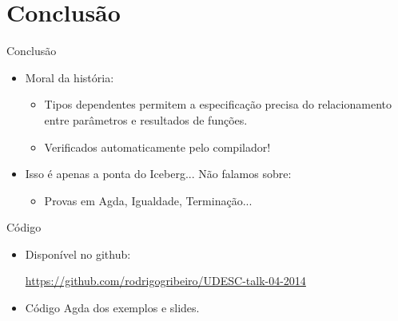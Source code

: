 \documentclass{beamer}
\begin{document}
       \section{Conclus\~ao}
       \begin{frame}{Conclus\~ao}
         \begin{itemize}
           \item Moral da hist\'oria:
           \begin{itemize}
             \item Tipos dependentes permitem a especifica\c{c}\~ao precisa do relacionamento entre par\^ametros e
                   resultados de fun\c{c}\~oes.
             \item Verificados automaticamente pelo compilador!
           \end{itemize}
           \item Isso \'e apenas a ponta do Iceberg... N\~ao falamos sobre:
           \begin{itemize}
             \item Provas em Agda, Igualdade, Termina\c{c}\~ao...
           \end{itemize}
         \end{itemize}
       \end{frame}
       \begin{frame}{C\'odigo}
         \begin{itemize}
           \item Dispon\'ivel no github: 
           \begin{center}
             \href{http://github.com/rodrigogribeiro/UDESC-talk-04-2014}{https://github.com/rodrigogribeiro/UDESC-talk-04-2014}
           \end{center}
           \item C\'odigo Agda dos exemplos e slides.
         \end{itemize}
       \end{frame}
    
\end{document}
